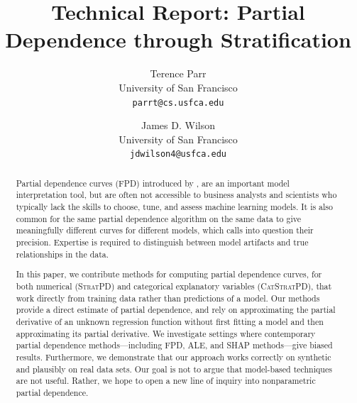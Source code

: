 \documentclass[]{article} %
\newcommand{\cut}[1]{}
\newcommand{\spd}{\fontfamily{cmr}\textsc{\small StratPD}}
\newcommand{\cspd}{\fontfamily{cmr}\textsc{\small CatStratPD}}
\begin{document}
\title{Technical Report: Partial Dependence through Stratification}

\author{Terence Parr\\
  University of San Francisco\\
  {\tt\small parrt@cs.usfca.edu}
  \and
  James D. Wilson \\
  University of San Francisco\\
  {\tt\small jdwilson4@usfca.edu} 
}

\cut{ %
\author{Terence Parr \and James D. Wilson}
\institute{Terence Parr \at
  University of San Francisco\\
  \email{{\tt parrt@cs.usfca.edu}}
  \and
  James D. Wilson \at
  University of San Francisco\\
  \email{{\tt jdwilson4@usfca.edu}} 
}
}


\maketitle

\begin{abstract}
Partial dependence curves (FPD) introduced by \citet{PDP}, are an important model interpretation tool, but are often not accessible to business analysts and scientists who typically lack the skills to choose, tune, and assess machine learning models.  It is also common for the same partial dependence algorithm on the same data to give meaningfully different curves for different models, which calls into question their precision.  Expertise is required to distinguish between model artifacts and true relationships in the data.

In this paper, we contribute methods for computing partial dependence curves, for both numerical (\spd) and categorical explanatory variables (\cspd), that work directly from training data rather than predictions of a model. Our methods provide a direct estimate of partial dependence, and rely on approximating the partial derivative of an unknown regression function without first fitting a model and then approximating its partial derivative. We investigate settings where contemporary partial dependence methods---including FPD, ALE, and SHAP methods---give biased results. Furthermore, we demonstrate that our approach works correctly on synthetic and plausibly on real data sets.  Our goal is not to argue that model-based techniques are not useful. Rather, we hope to open a new line of inquiry into nonparametric partial dependence.
\end{abstract}
\end{document}

